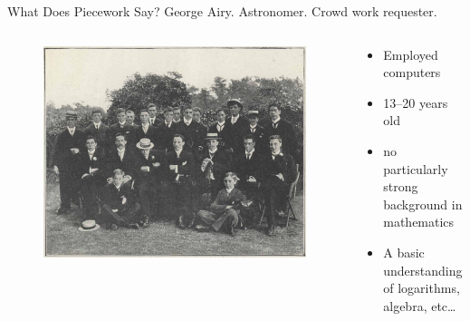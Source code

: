 \documentclass[presentation]{subfiles}
\begin{document}
\begin{frame}[t]{What Does Piecework Say?}
      George Airy. Astronomer. Crowd work requester.\par
      \scriptsize{\textcite{grier2013computers}\par}\normalsize{}
    \begin{columns}
    \begin{column}{0.6\textwidth}
      \begin{figure}
        \includegraphics[max width=\textwidth, max height=.7\textheight,keepaspectratio]{../../../presentations/common_figures/photo/Greenwich-Observatory-computing-staff-1902.jpg}
      \end{figure}
    \end{column}
    
    \begin{column}{0.4\textwidth}
      \begin{itemize}
        \item Employed computers
        \item 13--20 years old
        \item no particularly strong background in mathematics
        \item A basic understanding of logarithms, algebra, etc\dots
      \end{itemize}
    \end{column}
    \end{columns}

\end{frame}
\end{document}
